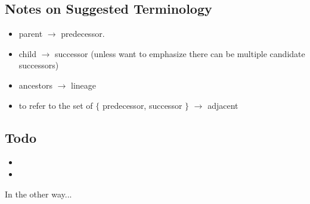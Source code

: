 \subsection{Notes on Suggested Terminology}
\begin{itemize}
\item parent $\rightarrow$ predecessor.
\item child $\rightarrow$ successor (unless want to emphasize there can be multiple candidate successors)
\item ancestors $\rightarrow$ lineage
\item to refer to the set of $\{$ predecessor, successor $\}$ $\rightarrow$ adjacent
\end{itemize}


\subsection{Todo}
\begin{itemize}
\item {}
\item {}
\end{itemize}


In the other way...

